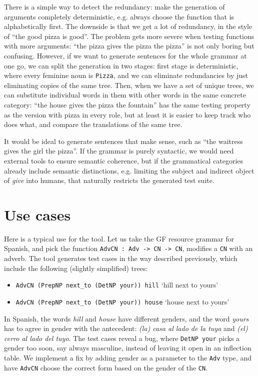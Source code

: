 \documentclass[runningheads]{llncs}
\def\t#1{\texttt{#1}}
\begin{document}
There is a simple way to detect the redundancy: make the generation of
arguments completely deterministic, e.g. always choose the function
that is alphabetically first. The downside is that we get a lot of
redundancy, in the style of ``the good pizza is good''. The problem
gets more severe when testing functions with more arguments: ``the
pizza gives the pizza the pizza'' is not only boring but confusing.
However, if we want to generate sentences for the whole grammar at one 
go, we can split the generation in two stages: first stage is
deterministic, where every feminine noun is \t{Pizza}, and we can 
eliminate redundancies by just eliminating copies of the same
tree. Then, when we have a set of unique trees, we can substitute
individual words in them with other words in the same concrete
category: ``the house gives the pizza the fountain'' has the same
testing property as the version with pizza in every role, but at least
it is easier to keep track who does what, and compare the translations
of the same tree. 

It would be ideal to generate sentences that make sense,
such as ``the waitress gives the girl the pizza''. If the grammar is
purely syntactic, we would need external tools to ensure semantic
coherence, but if the grammatical categories already include semantic
distinctions, e.g. limiting the subject and indirect object of
\emph{give} into humans, that naturally restricts the generated test suite.

\section{Use cases}

Here is a typical use for the tool. 
Let us take the GF resource grammar \cite{ranta2009rgl} for Spanish, and
pick the function \t{AdvCN : Adv -> CN -> CN}, modifies a \t{CN} with
an adverb.
The tool generates test cases in the way described previously,
which include the following (slightly simplified) trees: 
\begin{itemize}
\item \t{AdvCN (PrepNP next\_to (DetNP your)) hill} `hill next to
yours'
\item \t{AdvCN (PrepNP next\_to (DetNP your)) house} `house next
to yours'
\end{itemize}
In Spanish, the words \emph{hill} and \emph{house} have different
genders, and the word \emph{yours} has to agree in gender 
with the antecedent: \emph{(la) casa al lado de la tuya} and \emph{(el)
  cerro al lado del tuyo}. The test cases reveal a bug, where \t{DetNP your} 
picks a gender too soon, say always masculine, instead of leaving it
open in an inflection table. We implement a fix by adding gender as a
parameter to the \t{Adv} type, and have \t{AdvCN} choose the correct
form based on the gender of the \t{CN}.
\end{document}
